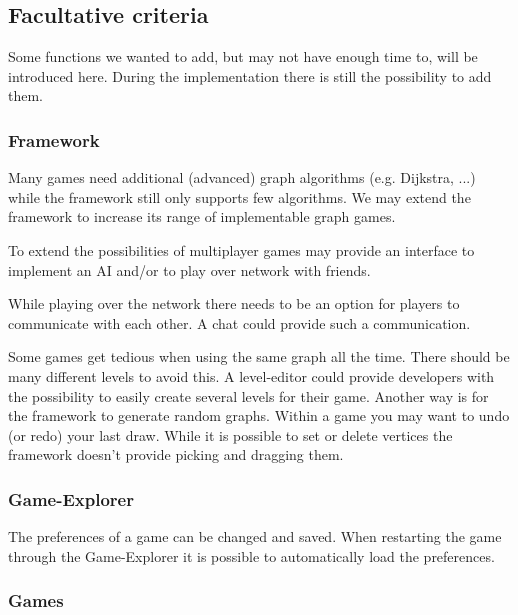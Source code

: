 \subsection{Facultative criteria}\label{REF:FACULTATIVE-CRITERIA}
Some functions we wanted to add, but may not have enough time to, will be introduced here. During the implementation there is still the possibility to add them.

\subsubsection{Framework}
Many \glspl{game} need additional (advanced) \gls{graph} \glspl{algorithm} (e.g. Dijkstra, ...)	while the \gls{framework} still only supports few algorithms. We may extend the framework to increase its range of implementable graph games. \par
To extend the possibilities of multiplayer games {\graphioli} may provide an interface to implement an \gls{AI} and/or to play over network with friends. \par
While playing over the network there needs to be an option for players to communicate with each other. A \gls{chat} could provide such a communication. \par
Some games get tedious when using the same graph all the time. There should be many different \glspl{level} to avoid this. A \gls{level-editor} could provide \glspl{developer} with the possibility to easily create several levels for their game. Another way is for the framework to generate random graphs.
Within a game you may want to \gls{undo} (or \gls{redo}) your last draw.
While it is possible to set or delete vertices the framework doesn't provide picking and dragging them.

\subsubsection{Game-Explorer}
The preferences of a game can be changed and saved. When restarting the game through the Game-Explorer it is possible to automatically load the preferences. \\

\subsubsection{Games}
